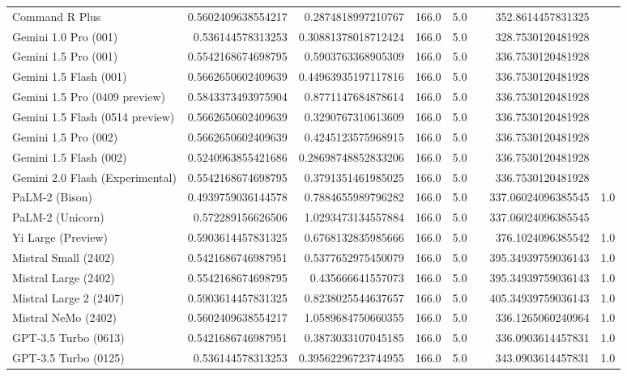 \begin{table}[htp]
{\begin{tabular}{lrrrrrrr}
Command R Plus & 0.5602409638554217 & 0.2874818997210767 & 166.0 & 5.0 &  & 352.8614457831325 &  \\
Gemini 1.0 Pro (001) & 0.536144578313253 & 0.30881378018712424 & 166.0 & 5.0 &  & 328.7530120481928 &  \\
Gemini 1.5 Pro (001) & 0.5542168674698795 & 0.5903763368905309 & 166.0 & 5.0 &  & 336.7530120481928 &  \\
Gemini 1.5 Flash (001) & 0.5662650602409639 & 0.44963935197117816 & 166.0 & 5.0 &  & 336.7530120481928 &  \\
Gemini 1.5 Pro (0409 preview) & 0.5843373493975904 & 0.8771147684878614 & 166.0 & 5.0 &  & 336.7530120481928 &  \\
Gemini 1.5 Flash (0514 preview) & 0.5662650602409639 & 0.3290767310613609 & 166.0 & 5.0 &  & 336.7530120481928 &  \\
Gemini 1.5 Pro (002) & 0.5662650602409639 & 0.4245123575968915 & 166.0 & 5.0 &  & 336.7530120481928 &  \\
Gemini 1.5 Flash (002) & 0.5240963855421686 & 0.28698748852833206 & 166.0 & 5.0 &  & 336.7530120481928 &  \\
Gemini 2.0 Flash (Experimental) & 0.5542168674698795 & 0.3791351461985025 & 166.0 & 5.0 &  & 336.7530120481928 &  \\
PaLM-2 (Bison) & 0.4939759036144578 & 0.7884655989796282 & 166.0 & 5.0 &  & 337.06024096385545 & 1.0 \\
PaLM-2 (Unicorn) & 0.572289156626506 & 1.0293473134557884 & 166.0 & 5.0 &  & 337.06024096385545 &  \\
Yi Large (Preview) & 0.5903614457831325 & 0.6768132835985666 & 166.0 & 5.0 &  & 376.1024096385542 & 1.0 \\
Mistral Small (2402) & 0.5421686746987951 & 0.5377652975450079 & 166.0 & 5.0 &  & 395.34939759036143 & 1.0 \\
Mistral Large (2402) & 0.5542168674698795 & 0.435666641557073 & 166.0 & 5.0 &  & 395.34939759036143 & 1.0 \\
Mistral Large 2 (2407) & 0.5903614457831325 & 0.8238025544637657 & 166.0 & 5.0 &  & 405.34939759036143 & 1.0 \\
Mistral NeMo (2402) & 0.5602409638554217 & 1.0589684750660355 & 166.0 & 5.0 &  & 336.1265060240964 & 1.0 \\
GPT-3.5 Turbo (0613) & 0.5421686746987951 & 0.3873033107045185 & 166.0 & 5.0 &  & 336.0903614457831 & 1.0 \\
GPT-3.5 Turbo (0125) & 0.536144578313253 & 0.39562296723744955 & 166.0 & 5.0 &  & 343.0903614457831 & 1.0 \\

\end{tabular}}
\end{table}
